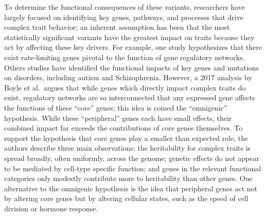 To determine the functional consequences of these variants, researchers have largely focused on identifying key genes, pathways, and processes that drive complex trait behavior; an inherent assumption has been that the most statistically significant variants have the greatest impact on traits because they act by affecting these key drivers. For example, one study hypothesizes that there exist rate-limiting genes pivotal to the function of gene regulatory networks. Others studies have identified the functional impacts of key genes and mutations on disorders, including autism and Schizophrenia. However, a 2017 analysis by Boyle et al.~argues that while genes which directly impact complex traits do exist, regulatory networks are so interconnected that any expressed gene affects the functions of these ``core'' genes; this idea is coined the ``omnigenic'' hypothesis. While these ``peripheral'' genes each have small effects, their combined impact far exceeds the contributions of core genes themselves. To support the hypothesis that core genes play a smaller than expected role, the authors describe three main observations: the heritability for complex traits is spread broadly, often uniformly, across the genome; genetic effects do not appear to be mediated by cell-type specific function; and genes in the relevant functional categories only modestly contribute more to heritability than other genes. One alternative to the omnigenic hypothesis is the idea that peripheral genes act not by altering core genes but by altering cellular states, such as the speed of cell division or hormone response.


